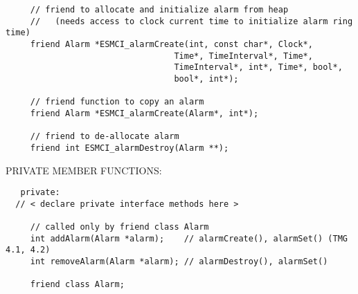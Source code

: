 \begin{verbatim}
     // friend to allocate and initialize alarm from heap
     //   (needs access to clock current time to initialize alarm ring time)
     friend Alarm *ESMCI_alarmCreate(int, const char*, Clock*, 
                                  Time*, TimeInterval*, Time*, 
                                  TimeInterval*, int*, Time*, bool*,
                                  bool*, int*);
 
     // friend function to copy an alarm
     friend Alarm *ESMCI_alarmCreate(Alarm*, int*);
 
     // friend to de-allocate alarm
     friend int ESMCI_alarmDestroy(Alarm **);
 \end{verbatim}{\sf PRIVATE MEMBER FUNCTIONS:}
\begin{verbatim}   private:
  // < declare private interface methods here >
 
     // called only by friend class Alarm
     int addAlarm(Alarm *alarm);    // alarmCreate(), alarmSet() (TMG 4.1, 4.2)
     int removeAlarm(Alarm *alarm); // alarmDestroy(), alarmSet()
 
     friend class Alarm;
 \end{verbatim}

\setlength{\parskip}{\oldparskip}
\setlength{\parindent}{\oldparindent}
\setlength{\baselineskip}{\oldbaselineskip}
